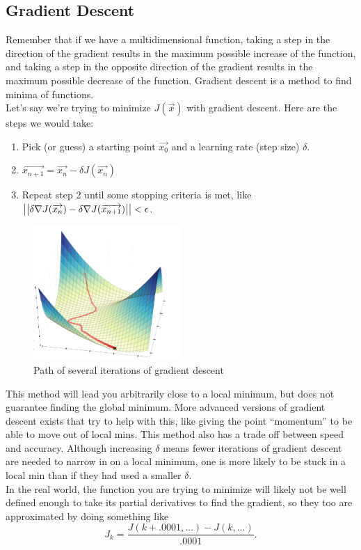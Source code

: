 \subsection{Gradient Descent}
\noindent
Remember that if we have a multidimensional function, taking a step in the direction of the gradient results in the maximum possible increase of the function, and taking a step in the opposite direction of the gradient results in the maximum possible decrease of the function.
Gradient descent is a method to find minima of functions.\\

\noindent
Let's say we're trying to minimize $J(\vec{x})$ with gradient descent. Here are the steps we would take:
\begin{enumerate}
	\item Pick (or guess) a starting point $\vec{x_0}$ and a learning rate (step size) $\delta$.
	\item $\overrightarrow{x_{n+1}} = \overrightarrow{x_n} - \delta J(\overrightarrow{x_n})$
	\item Repeat step 2 until some stopping criteria is met, like $\big\lvert \big\lvert \delta \nabla J(\overrightarrow{x_n}) - \delta \nabla J(\overrightarrow{x_{n+1}}) \big\rvert \big\rvert < \epsilon$.
\end{enumerate}

\begin{figure}[H]
	\centering
	\includegraphics[width=0.5\textwidth]{./Images/differentialMultivariableCalculus/gradient_descent.png}
	\caption{Path of several iterations of gradient descent}
\end{figure}

\noindent
This method will lead you arbitrarily close to a local minimum, but does not guarantee finding the global minimum.
More advanced versions of gradient descent exists that try to help with this, like giving the point ``momentum'' to be able to move out of local mins.
This method also has a trade off between speed and accuracy.
Although increasing $\delta$ means fewer iterations of gradient descent are needed to narrow in on a local minimum, one is more likely to be stuck in a local min than if they had used a smaller $\delta$.\\

\noindent
In the real world, the function you are trying to minimize will likely not be well defined enough to take its partial derivatives to find the gradient, so they too are approximated by doing something like
\begin{equation*}
	J_{k} = \frac{J(k+.0001, \ldots) - J(k, \ldots)}{.0001}.
\end{equation*}